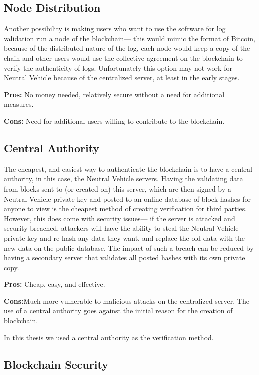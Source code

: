 \subsection{Node Distribution}{Another possibility is making users who want to use the software for log validation run a node of the blockchain--- this would mimic the format of Bitcoin, because of the distributed nature of the log, each node would keep a copy of the chain and other users would use the collective agreement on the blockchain to verify the authenticity of logs. \cite{Bitcoin}
Unfortunately this option may not work for Neutral Vehicle because of the centralized server, at least in the early stages.

\textbf{Pros:} No money needed, relatively secure without a need for additional measures.

\textbf{Cons:} Need for additional users willing to contribute to the blockchain.
}

\subsection{Central Authority}{The cheapest, and easiest way to authenticate the blockchain is to have a central authority, in this case, the Neutral Vehicle servers. Having the validating data from blocks sent to (or created on) this server, which are then signed by a Neutral Vehicle private key and posted to an online database of block hashes for anyone to view is the cheapest method of creating verification for third parties. However, this does come with security issues--- if the server is attacked and security breached, attackers will have the ability to steal the Neutral Vehicle private key and re-hash any data they want, and replace the old data with the new data on the public database. The impact of such a breach can be reduced by having a secondary server that validates all posted hashes with its own private copy.

\textbf{Pros:} Cheap, easy, and effective.

\textbf{Cons:}Much more vulnerable to malicious attacks on the centralized server. The use of a central authority goes against the initial reason for the creation of blockchain.
}

In this thesis we used a central authority as the verification method. 
        
\subsection{Blockchain Security}

